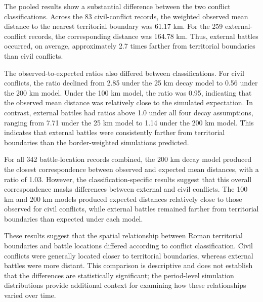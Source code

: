 \documentclass[
  letterpaper,
  DIV=11,
  numbers=noendperiod]{scrartcl}
\begin{document}
The pooled results show a substantial difference between the two
conflict classifications. Across the 83 civil-conflict records, the
weighted observed mean distance to the nearest territorial boundary was
61.17 km. For the 259 external-conflict records, the corresponding
distance was 164.78 km. Thus, external battles occurred, on average,
approximately 2.7 times farther from territorial boundaries than civil
conflicts.

The observed-to-expected ratios also differed between classifications.
For civil conflicts, the ratio declined from 2.85 under the 25 km decay
model to 0.56 under the 200 km model. Under the 100 km model, the ratio
was 0.95, indicating that the observed mean distance was relatively
close to the simulated expectation. In contrast, external battles had
ratios above 1.0 under all four decay assumptions, ranging from 7.71
under the 25 km model to 1.14 under the 200 km model. This indicates
that external battles were consistently farther from territorial
boundaries than the border-weighted simulations predicted.

For all 342 battle-location records combined, the 200 km decay model
produced the closest correspondence between observed and expected mean
distances, with a ratio of 1.03. However, the classification-specific
results suggest that this overall correspondence masks differences
between external and civil conflicts. The 100 km and 200 km models
produced expected distances relatively close to those observed for civil
conflicts, while external battles remained farther from territorial
boundaries than expected under each model.

These results suggest that the spatial relationship between Roman
territorial boundaries and battle locations differed according to
conflict classification. Civil conflicts were generally located closer
to territorial boundaries, whereas external battles were more distant.
This comparison is descriptive and does not establish that the
differences are statistically significant; the period-level simulation
distributions provide additional context for examining how these
relationships varied over time.
\end{document}
